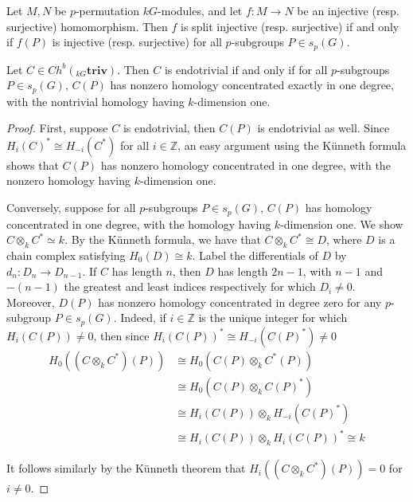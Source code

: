 \documentclass[10pt,a4paper]{amsart}
\newcommand{\Z}{\mathbb{Z}}
\begin{document}
	\begin{theorem}\label{permsplit}
		Let $M, N$ be $p$-permutation $kG$-modules, and let $f: M \to N$ be an injective (resp. surjective) homomorphism. Then $f$ is split injective (resp. surjective) if and only if $f(P)$ is injective (resp. surjective) for all $p$-subgroups $P\in s_p(G)$.
	\end{theorem}

	\begin{theorem}\label{endotrivdef2}
		Let $C \in Ch^b({}_{kG}\textbf{triv})$. Then $C$ is endotrivial if and only if for all $p$-subgroups $P \in s_p(G)$, $C(P)$ has nonzero homology concentrated exactly in one degree, with the nontrivial homology having $k$-dimension one.
	\end{theorem}

	\begin{proof}
		First, suppose $C$ is endotrivial, then $C(P)$ is endotrivial as well. Since $H_i(C)^* \cong H_{-i}(C^*)$ for all $i \in \Z$, an easy argument using the K{\"u}nneth formula shows that $C(P)$ has nonzero homology concentrated in one degree, with the nonzero homology having $k$-dimension one.

		Conversely, suppose for all $p$-subgroups $P \in s_p(G)$, $C(P)$ has homology concentrated in one degree, with the homology having $k$-dimension one. We show $C\otimes_k C^* \simeq k$. By the K{\"u}nneth formula, we have that $C \otimes_k C^* \cong D$, where $D$ is a chain complex satisfying $ H_0(D) \cong k$. Label the differentials of $D$ by $d_n: D_n \to D_{n-1}$. If $C$ has length $n$, then $D$ has length $2n - 1$, with $n-1$ and $-(n-1)$ the greatest and least indices respectively for which $D_i \neq 0$. Moreover, $D(P)$ has nonzero homology concentrated in degree zero for any $p$-subgroup $P\in s_p(G)$. Indeed, if $i \in \Z$ is the unique integer for which $H_i(C(P))\neq 0$, then since $H_i(C(P))^* \cong H_{-i}(C(P)^*) \neq 0$
        \begin{align*}
            H_0((C\otimes_k C^*)(P)) &\cong H_0(C(P) \otimes_k C^*(P))\\
            &\cong H_0(C(P) \otimes_k C(P)^*) \\
            &\cong H_i(C(P)) \otimes_k H_{-i}(C(P)^*) \\
            &\cong H_i(C(P)) \otimes_k H_i(C(P))^* \cong  k
        \end{align*}

        It follows similarly by the K\"unneth theorem that $H_i((C\otimes_k C^*)(P)) = 0$ for $i \neq 0.$


\end{proof}
\end{document}
